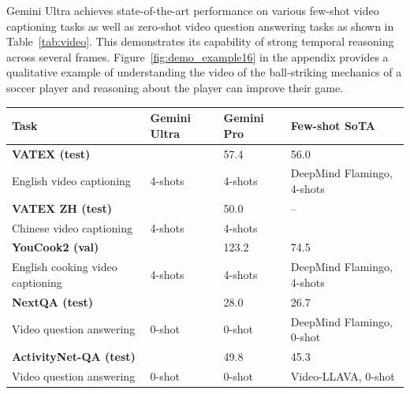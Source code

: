 Gemini Ultra achieves state-of-the-art performance on various few-shot video captioning tasks as well as zero-shot video question answering tasks as shown in Table~\ref{tab:video}. This demonstrates its capability of strong temporal reasoning across several frames. Figure~\ref{fig:demo_example16} in the appendix provides a qualitative example of understanding the video of the ball-striking mechanics of a soccer player and reasoning about the player can improve their game.

\begin{table}[h!]
    \setlength{\tabcolsep}{6pt}
    \centering
    \scriptsize
    \begin{tabular}{p{4.5cm}p{2.5cm}p{2.5cm}L{3cm}}
    \toprule
Task & 
{Gemini Ultra} &
{Gemini Pro} & 
{Few-shot SoTA}
 \\
\midrule
\textbf{VATEX (test)} &  & 57.4 & 56.0 \\
\tiny{English video captioning \newline\citep{vatex}} & {\tiny{4-shots}} & \tiny{4-shots} &  \tiny{DeepMind Flamingo, 4-shots} \\

\addlinespace[2ex]

\textbf{VATEX ZH (test)} &  & 50.0 &  --\\
\tiny{Chinese video captioning \newline\citep{vatex}} & {\tiny{4-shots}} & \tiny{4-shots} &  \\

\addlinespace[2ex]

\textbf{YouCook2 (val)} &  & 123.2 & 74.5 \\
\tiny{English cooking video captioning \newline\citep{youcook2}} &  {\tiny{4-shots}} & \tiny{4-shots} & \tiny{DeepMind Flamingo, 4-shots} \\

\addlinespace[2ex]

\textbf{NextQA (test)} &  & 28.0 & 26.7 \\
\tiny{Video question answering \newline\citep{nextqa}} & {\tiny{0-shot}} & \tiny{0-shot} &  \tiny{DeepMind Flamingo, 0-shot}\\

\addlinespace[2ex]

\textbf{ActivityNet-QA (test) } &  & 49.8 & 45.3 \\
\tiny{Video question answering \newline\citep{activitynetqa}} & {\tiny{0-shot}} & \tiny{0-shot} & \tiny{Video-LLAVA, 0-shot} \\


\end{tabular}
\end{table}
